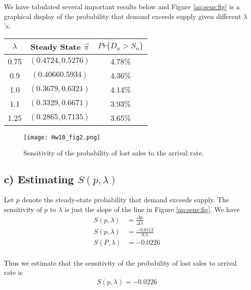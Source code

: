\documentclass[11pt,letterpaper]{article}
\begin{document}
We have tabulated several important results below and Figure \eqref{aq:sens:fig} is a graphical display of the probability that demand exceeds supply given different $\lambda$'s.

\begin{center}
	\begin{tabular}{c | c | c}
	$\lambda$ & Steady State $\vec{\pi}$ & $Pr\{D_n > S_n\}$ \\
    \hline
    0.75 & $(0.4724, 0.5276)$ & 4.78\% \\
	0.9 & $(0.4066	0.5934)$ & 4.36\% \\
    1.0 & $(0.3679, 0.6321)$ & 4.14\% \\
    1.1 & $(0.3329, 0.6671)$ & 3.93\% \\
    1.25 & $(0.2865, 0.7135)$ & 3.65\%
	\end{tabular}
\end{center}

\begin{figure}[h]
\texttt{[image: Hw10\_fig2.png]}
\caption{\label{aq:sens:fig} Sensitivity of the probability of lost sales to the arrival rate.}
\end{figure}








\subsection*{c) Estimating $S(p,\lambda)$}
Let $p$ denote the steady-state probability that demand exceeds supply. The sensitivity of $p$ to $\lambda$ is just the slope of the line in Figure \eqref{aq:sens:fig}. We have
\begin{align*}
S(p,\lambda) & = \frac{\Delta p}{\Delta \lambda} \\
S(p,\lambda) & = \frac{-0.0113}{0.5} \\
S(P,\lambda) & = -0.0226 \\
\end{align*}

Thus we estimate that the sensitivity of the probability of lost sales to arrival rate is
\begin{align*}
S(p,\lambda) = -0.0226
\end{align*}
\end{document}
